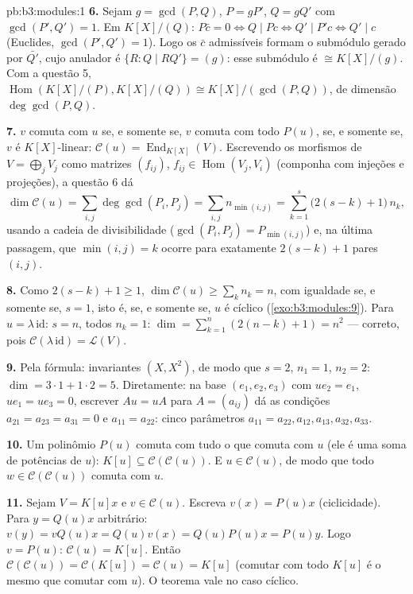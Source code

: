 \begin{solution}{pb:b3:modules:1}
\textbf{6.} Sejam $g = \gcd(P, Q)$, $P = gP'$, $Q = gQ'$ com $\gcd(P', Q') = 1$. Em $K[X]/(Q)$: $P\bar c = 0 \iff Q \mid Pc
\iff Q' \mid P'c \iff Q' \mid c$
(Euclides, $\gcd(P', Q') = 1$). Logo os $\bar c$ admissíveis formam o submódulo
gerado por $\bar{Q'}$, cujo anulador é $\{R : Q \mid RQ'\} = (g)$: esse submódulo é $\cong K[X]/(g)$. Com a
questão 5, $\operatorname{Hom}(K[X]/(P), K[X]/(Q)) \cong K[X]/(\gcd(P,Q))$, de dimensão $\deg\gcd(P,Q)$.

\textbf{7.} $v$ comuta com $u$ se, e somente se, $v$ comuta
com todo $P(u)$, se, e somente se, $v$ é $K[X]$-linear:
$\mathcal C(u) =
\operatorname{End}_{K[X]}(V)$. Escrevendo os morfismos de $V =
\bigoplus_j V_j$ como matrizes $(f_{ij})$, $f_{ij} \in
\operatorname{Hom}(V_j, V_i)$
(componha com injeções e projeções), a questão 6 dá
\[
\dim \mathcal C(u) = \sum_{i,j} \deg\gcd(P_i, P_j)
= \sum_{i,j} n_{\min(i,j)}
= \sum_{k=1}^{s} \bigl(2(s - k) + 1\bigr)\,n_k ,
\]
usando a cadeia de divisibilidade ($\gcd(P_i, P_j) =
P_{\min(i,j)}$) e, na última passagem, que
$\min(i,j) = k$ ocorre para exatamente $2(s - k) + 1$ pares $(i, j)$.

\textbf{8.} Como $2(s-k)+1 \geq 1$, $\dim\mathcal C(u) \geq
\sum_k n_k = n$, com igualdade se, e somente se, $s = 1$,
isto é, se, e somente se, $u$ é cíclico (\cref{exo:b3:modules:9}). Para $u = \lambda\,\mathrm{id}$:
$s = n$, todos $n_k = 1$: $\dim = \sum_{k=1}^n (2(n-k)+1) = n^2$ --- correto, pois $\mathcal C(\lambda\,\mathrm{id}) = \mathcal
L(V)$.

\textbf{9.} Pela fórmula: invariantes $(X, X^2)$, de modo que $s = 2$,
$n_1 =
1$, $n_2 = 2$: $\dim = 3\cdot1 + 1\cdot2 = 5$. Diretamente: na base $(e_1, e_2, e_3)$ com $u e_2 = e_1$, $ue_1 = ue_3 = 0$, escrever
$Au = uA$ para $A = (a_{ij})$ dá as condições $a_{21} = a_{23} = a_{31} = 0$ e $a_{11} = a_{22}$: cinco parâmetros 
$a_{11}{=}a_{22}, a_{12}, a_{13}, a_{32}, a_{33}$.

\textbf{10.} Um polinômio $P(u)$ comuta com tudo o que comuta com
$u$ (ele é uma soma de potências de $u$): $K[u]
\subseteq \mathcal C(\mathcal C(u))$. E $u \in \mathcal C(u)$, de modo
que todo $w \in \mathcal C(\mathcal C(u))$ comuta com $u$.

\textbf{11.} Sejam $V = K[u]x$ e $v \in \mathcal C(u)$. Escreva $v(x) = P(u)x$ (ciclicidade). Para $y = Q(u)x$
arbitrário: $v(y) =
vQ(u)x = Q(u)v(x) = Q(u)P(u)x = P(u)y$. Logo $v = P(u)$: $\mathcal
C(u) = K[u]$. Então $\mathcal C(\mathcal C(u)) = \mathcal
C(K[u]) = \mathcal C(u) = K[u]$ (comutar com todo
$K[u]$ é o mesmo que comutar com $u$). O teorema vale no caso
cíclico.


\end{solution}
